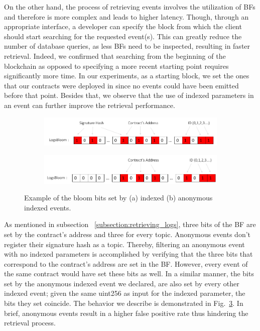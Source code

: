 On the other hand, the process of retrieving events involves the utilization of BFs and therefore is more complex and leads to higher latency. Though, through an appropriate interface, a developer can specify the block from which the client should start searching for the requested event(s). This can greatly reduce the number of database queries, as less BFs need to be inspected, resulting in faster retrieval. Indeed, we confirmed that searching from the beginning of the blockchain as opposed to specifying a more recent starting point requires significantly more time. In our experiments, as a starting block, we set the ones that our contracts were deployed in since no events could have been emitted before that point. Besides that, we observe that the use of indexed parameters in an event can further improve the retrieval performance.

\begin{figure}
    \begin{subfigure}{\linewidth}
        \centerline{\includegraphics[width=\textwidth]{figs/bloom_indexed.pdf}}
        \caption{}
        \label{fig:bloom_indexed}
    \end{subfigure}
    \begin{subfigure}{\linewidth}
        \centerline{\includegraphics[width=\textwidth]{figs/bloom_anonymous.pdf}}
        \caption{}
        \label{fig:bloom_anonymous}
    \end{subfigure}
    \caption{Example of the bloom bits set by (a) indexed (b) anonymous indexed events.}
    \label{fig:bloom_combined}
\end{figure}

As mentioned in subsection ~\ref{subsection:retrieving_logs}, three bits of the BF are set by the contract’s address and three for every topic. Anonymous events don’t register their signature hash as a topic. Thereby, filtering an anonymous event with no indexed parameters is accomplished by verifying that the three bits that correspond to the contract’s address are set in the BF. However, every event of the same contract would have set these bits as well. In a similar manner, the bits set by the anonymous indexed event we declared, are also set by every other indexed event; given the same uint256 as input for the indexed parameter, the bits they set coincide. The behavior we describe is demonstrated in Fig.~\ref{fig:bloom_combined}. In brief, anonymous events result in a higher false positive rate thus hindering the retrieval process.

